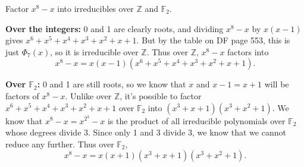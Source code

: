 \documentclass[10pt]{report}
\begin{document}
\begin{exer}[DF 14.3: 1]
Factor $x^8-x$ into irreducibles over $\mathbb{Z}$ and $\mathbb{F}_{2}$.
\end{exer}
\textbf{Over the integers:} 0 and 1 are clearly roots, and dividing $x^8-x$ by $x(x-1)$ gives $x^6 + x^5 + x^4 + x^3 + x^2 + x + 1$. But by the table on DF page 553, this is just $\Phi_{7}(x)$, so it is irreducible over $\mathbb{Z}$. Thus over $\mathbb{Z}$, $x^8-x$ factors into
\[
	x^8-x = x(x-1)(x^6 + x^5 + x^4 + x^3 + x^2 + x + 1).
\] 

\textbf{Over $\mathbb{F}_{2}$:} 0 and 1 are still roots, so we know that $x$ and $x-1=x+1$ will be factors of $x^8-x$. Unlike over $\mathbb{Z}$, it's possible to factor $x^6 + x^5 + x^4 + x^3 + x^2 + x + 1$ over $\mathbb{F}_{2}$ into $(x^3+x+1)(x^3+x^2+1)$. We know that $x^8-x = x^{2^3}-x$ is the product of all irreducible polynomials over $\mathbb{F}_{2}$ whose degrees divide $3$. Since only 1 and 3 divide 3, we know that we cannot reduce any further. Thus over $\mathbb{F}_{2}$,
\[
	x^8-x = x(x+1)(x^3+x+1)(x^3+x^2+1).
\] 
\end{document}
